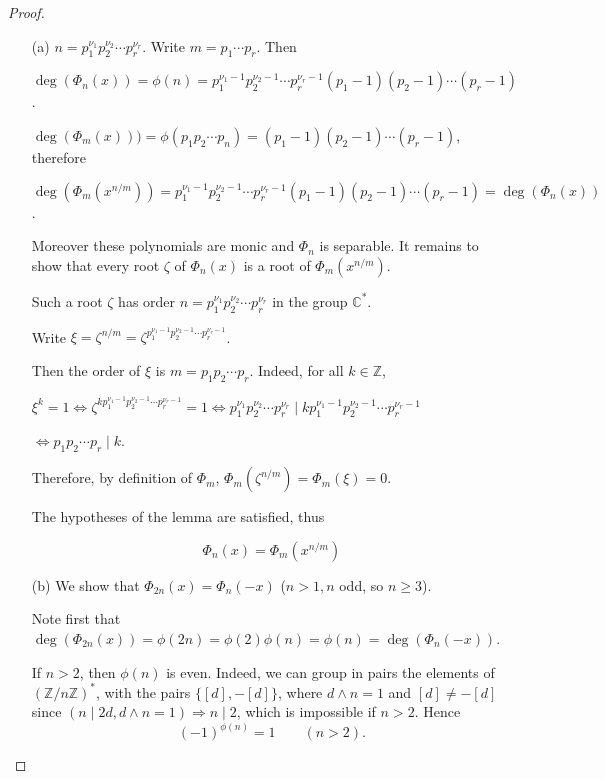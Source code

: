 \documentclass[11pt,a4paper]{article}
\begin{document}
\begin{proof}
\begin{enumerate}

\item[(a)]
$n = p_1^{\nu_1} p_2^{\nu_2}\cdots p_r^{\nu_r}$. Write $m = p_1\cdots p_r$.  Then

$\deg(\Phi_n(x)) = \phi(n) = p_1^{\nu_1-1} p_2^{\nu_2-1}\cdots p_r^{\nu_r-1}(p_1-1)(p_2-1)\cdots (p_r-1)$.

$\deg (\Phi_m(x))) = \phi(p_1 p_2\cdots p_n) = (p_1-1)(p_2-1)\cdots(p_r-1)$, therefore

$\deg (\Phi_m(x^{n/m})) = p_1^{\nu_1-1} p_2^{\nu_2-1}\cdots p_r^{\nu_r-1}(p_1-1)(p_2-1)\cdots (p_r-1) = \deg(\Phi_n(x))$.

Moreover these polynomials are monic and $\Phi_n$ is separable. It remains to show that every root $\zeta$ of $\Phi_n(x)$ is a root of $\Phi_m(x^{n/m})$.

Such a root  $\zeta$ has order $n = p_1^{\nu_1} p_2^{\nu_2}\cdots p_r^{\nu_r}$ in the group $\mathbb{C}^*$.

Write $\xi = \zeta^{n/m} = \zeta^{p_1^{\nu_1-1} p_2^{\nu_2-1}\cdots p_r^{\nu_r-1}}$.

Then the order of $\xi$ is $m = p_1p_2\cdots p_r$. Indeed,  for all $k \in \mathbb{Z}$,

$\xi^k=1 \iff \zeta ^{k p_1^{\nu_1-1} p_2^{\nu_2-1}\cdots p_r^{\nu_r-1}} = 1 \iff p_1^{\nu_1} p_2^{\nu_2}\cdots p_r^{\nu_r} \mid k p_1^{\nu_1-1} p_2^{\nu_2-1}\cdots p_r^{\nu_r-1}$

$\iff p_1p_2\cdots p_r \mid k$.

Therefore, by definition of $\Phi_m$,  $\Phi_{m}(\zeta^{n/m}) = \Phi_{m}(\xi) = 0$. 

The hypotheses of the lemma  are satisfied, thus

$$\Phi_n(x) = \Phi_{m}(x^{n/m})$$

\item[(b)]
We show that $\Phi_{2n}(x) = \Phi_n(-x)$ ($n>1, n$ odd, so $n\geq 3$).


Note first that $\deg(\Phi_{2n}(x)) = \phi(2n) = \phi(2) \phi(n) = \phi(n) = \deg(\Phi_n(-x))$.

If $n>2$, then $\phi(n)$ is even. Indeed, we can group in pairs the elements of $(\mathbb{Z}/ n \mathbb{Z})^*$, with the pairs $\{[d],-[d]\}$, where $d \wedge n = 1$ and $ [d] \neq -[d]$ since $(n \mid 2d , d \wedge n = 1) \Rightarrow n \mid 2$, which is impossible if $n > 2$. Hence
$$ (-1)^{\phi(n)} = 1\qquad (n>2).$$


\end{enumerate}
\end{proof}
\end{document}
